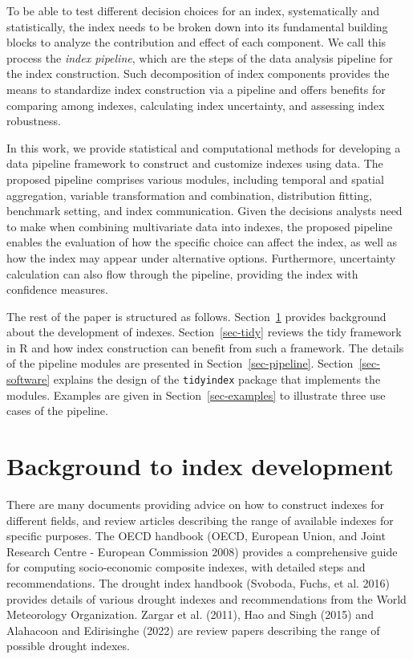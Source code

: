 \documentclass[
]{interact}
\begin{document}
To be able to test different decision choices for an index,
systematically and statistically, the index needs to be broken down into
its fundamental building blocks to analyze the contribution and effect
of each component. We call this process the \emph{index pipeline}, which
are the steps of the data analysis pipeline for the index construction.
Such decomposition of index components provides the means to standardize
index construction via a pipeline and offers benefits for comparing
among indexes, calculating index uncertainty, and assessing index
robustness.

In this work, we provide statistical and computational methods for
developing a data pipeline framework to construct and customize indexes
using data. The proposed pipeline comprises various modules, including
temporal and spatial aggregation, variable transformation and
combination, distribution fitting, benchmark setting, and index
communication. Given the decisions analysts need to make when combining
multivariate data into indexes, the proposed pipeline enables the
evaluation of how the specific choice can affect the index, as well as
how the index may appear under alternative options. Furthermore,
uncertainty calculation can also flow through the pipeline, providing
the index with confidence measures.

The rest of the paper is structured as follows.
Section~\ref{sec-idx-dev} provides background about the development of
indexes. Section~\ref{sec-tidy} reviews the tidy framework in R and how
index construction can benefit from such a framework. The details of the
pipeline modules are presented in Section~\ref{sec-pipeline}.
Section~\ref{sec-software} explains the design of the \texttt{tidyindex}
package that implements the modules. Examples are given in
Section~\ref{sec-examples} to illustrate three use cases of the
pipeline.

\section{Background to index development}\label{sec-idx-dev}

There are many documents providing advice on how to construct indexes
for different fields, and review articles describing the range of
available indexes for specific purposes. The OECD handbook (OECD,
European Union, and Joint Research Centre - European Commission 2008)
provides a comprehensive guide for computing socio-economic composite
indexes, with detailed steps and recommendations. The drought index
handbook (Svoboda, Fuchs, et al. 2016) provides details of various
drought indexes and recommendations from the World Meteorology
Organization. Zargar et al. (2011), Hao and Singh (2015) and Alahacoon
and Edirisinghe (2022) are review papers describing the range of
possible drought indexes.
\end{document}
